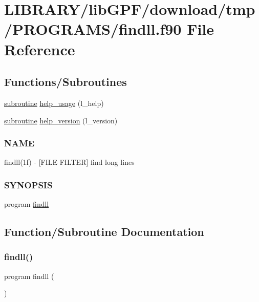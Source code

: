 \hypertarget{findll_8f90}{}\section{L\+I\+B\+R\+A\+R\+Y/lib\+G\+P\+F/download/tmp/\+P\+R\+O\+G\+R\+A\+M\+S/findll.f90 File Reference}
\label{findll_8f90}
\subsection*{Functions/\+Subroutines}
\begin{DoxyCompactItemize}
\item 
\hyperlink{M__stopwatch_83_8txt_acfbcff50169d691ff02d4a123ed70482}{subroutine} \hyperlink{findll_8f90_a3e09a3b52ee8fb04eeb93fe5761626a8}{help\+\_\+usage} (l\+\_\+help)
\item 
\hyperlink{M__stopwatch_83_8txt_acfbcff50169d691ff02d4a123ed70482}{subroutine} \hyperlink{findll_8f90_a39c21619b08a3c22f19e2306efd7f766}{help\+\_\+version} (l\+\_\+version)
\begin{DoxyCompactList}\small\item\em \subsubsection*{N\+A\+ME}

findll(1f) -\/ \mbox{[}F\+I\+LE F\+I\+L\+T\+ER\mbox{]} find long lines \subsubsection*{S\+Y\+N\+O\+P\+S\+IS}\end{DoxyCompactList}\item 
program \hyperlink{findll_8f90_ad79178a6988911a19f458d5ce80255ea}{findll}
\end{DoxyCompactItemize}


\subsection{Function/\+Subroutine Documentation}
\mbox{\label{findll_8f90_ad79178a6988911a19f458d5ce80255ea}} 
\subsubsection{\texorpdfstring{findll()}{findll()}}
{\footnotesize\ttfamily program findll (\begin{DoxyParamCaption}{ }\end{DoxyParamCaption})}



